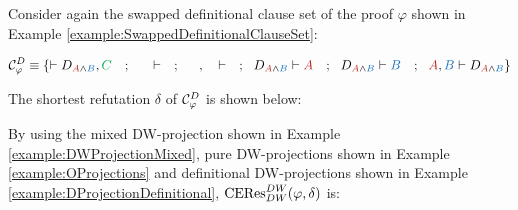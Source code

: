 \begin{example}

Consider again the swapped definitional clause set of the proof $\varphi$ shown in Example \ref{example:SwappedDefinitionalClauseSet}:

$$
\clausesetSwappedDefinitionalUnique{\varphi} \equiv  \left\{
	\seq D_{\hA{A} \structplus \hB{B}} , \hE{C} 
\ \ \ ; \ \
	\hF{C} \seq 
\ \ \ ; \ \
	\hC{B} , \hD{A} \seq
\ \ \ ; \ \
	D_{\hA{A} \structplus \hB{B}} \seq \hA{A}  
\ \ \ ; \ \
	D_{\hA{A} \structplus \hB{B}} \seq \hB{B} 
\ \ \ ; \ \
	\hA{A}, \hB{B} \seq D_{\hA{A} \structplus \hB{B}} 
\right\}
$$

The shortest refutation $\delta$ of $\mathcal{C}^{D}_{\varphi}$ is shown below:

\begin{prooftree}
		 
	\BIC{$\seq D_{\hA{A} \structplus \hB{B}}$}
								 
							 
					 
					 
			\BIC{$ \seq $}
\end{prooftree}

By using the mixed DW-projection shown in Example \ref{example:DWProjectionMixed}, pure DW-projections shown in Example \ref{example:OProjections} and definitional DW-projections shown in Example \ref{example:DProjectionDefinitional}, $\mathrm{CERes}^{DW}_{DW}(\varphi,\delta)$ is:



\end{example}
